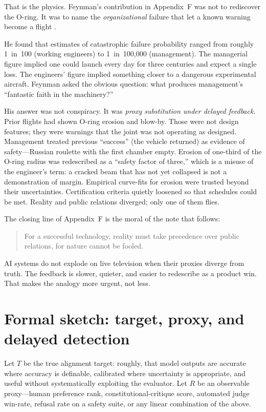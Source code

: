 \documentclass[11pt]{article}
\begin{document}
That is the physics. Feynman's contribution in Appendix~F was not to rediscover the O-ring. It was to name the \emph{organizational} failure that let a known warning become a flight \cite{feynman1986}.

He found that estimates of catastrophic failure probability ranged from roughly 1~in~100 (working engineers) to 1~in~100{,}000 (management). The managerial figure implied one could launch every day for three centuries and expect a single loss. The engineers' figure implied something closer to a dangerous experimental aircraft. Feynman asked the obvious question: what produces management's ``fantastic faith in the machinery?''

His answer was not conspiracy. It was \emph{proxy substitution under delayed feedback}. Prior flights had shown O-ring erosion and blow-by. Those were not design features; they were warnings that the joint was not operating as designed. Management treated previous ``success'' (the vehicle returned) as evidence of safety---Russian roulette with the first chamber empty. Erosion of one-third of the O-ring radius was redescribed as a ``safety factor of three,'' which is a misuse of the engineer's term: a cracked beam that has not yet collapsed is not a demonstration of margin. Empirical curve-fits for erosion were trusted beyond their uncertainties. Certification criteria quietly loosened so that schedules could be met. Reality and public relations diverged; only one of them flies.

The closing line of Appendix~F is the moral of the note that follows:
\begin{quote}
For a successful technology, reality must take precedence over public relations, for nature cannot be fooled.
\end{quote}

AI systems do not explode on live television when their proxies diverge from truth. The feedback is slower, quieter, and easier to redescribe as a product win. That makes the analogy more urgent, not less.

\section{Formal sketch: target, proxy, and delayed detection}

Let \(T\) be the true alignment target: roughly, that model outputs are accurate where accuracy is definable, calibrated where uncertainty is appropriate, and useful without systematically exploiting the evaluator. Let \(R\) be an observable proxy---human preference rank, constitutional-critique score, automated judge win-rate, refusal rate on a safety suite, or any linear combination of the above.
\end{document}
